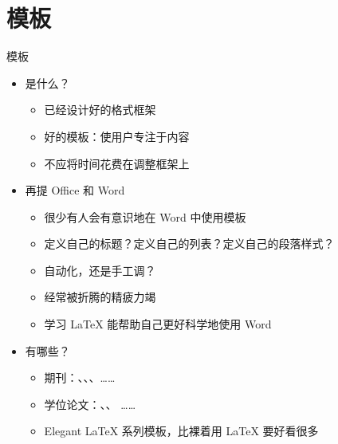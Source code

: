 \section{模板}

\begin{frame}[fragile]{模板}
  \begin{itemize}
    \item<+-> 是什么？
  
      \begin{itemize}
        \item 已经设计好的格式框架
        \item 好的模板：使用户专注于内容
        \item 不应将时间花费在调整框架上
      \end{itemize}
    
      \item 再提 Office 和 Word
          \begin{itemize}
            \item 很少有人会有意识地在 Word 中使用模板
            \item 定义自己的标题？定义自己的列表？定义自己的段落样式？
            \item 自动化，还是手工调？
            \item 经常被折腾的精疲力竭
            \item 学习 \LaTeX{} 能帮助自己更好科学地使用 Word
          \end{itemize}

    \item<+-> 有哪些？
  
      \begin{itemize}
        \item 期刊：、、、……
        \item 学位论文：、、\alert{ }……
        \item Elegant LaTeX  系列模板，比裸着用 \LaTeX{} 要好看很多
      \end{itemize}
  
  
  
  \end{itemize}
\end{frame}

